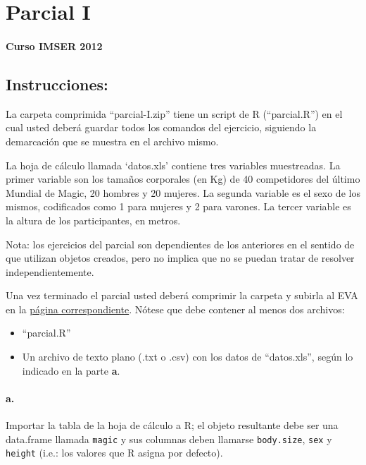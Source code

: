 \documentclass[]{article}
\begin{document}
\section{Parcial I}

\paragraph{Curso IMSER 2012}

\subsection{Instrucciones:}

La carpeta comprimida ``parcial-I.zip'' tiene un script de R
(``parcial.R'') en el cual usted deberá guardar todos los comandos del
ejercicio, siguiendo la demarcación que se muestra en el archivo mismo.

La hoja de cálculo llamada `datos.xls' contiene tres variables
muestreadas. La primer variable son los tamaños corporales (en Kg) de 40
competidores del último Mundial de Magic, 20 hombres y 20 mujeres. La
segunda variable es el sexo de los mismos, codificados como 1 para
mujeres y 2 para varones. La tercer variable es la altura de los
participantes, en metros.

Nota: los ejercicios del parcial son dependientes de los anteriores en
el sentido de que utilizan objetos creados, pero no implica que no se
puedan tratar de resolver independientemente.

Una vez terminado el parcial usted deberá comprimir la carpeta y subirla
al EVA en la
\href{http://eva.universidad.edu.uy/mod/assignment/view.php?id=99264}{página
correspondiente}. Nótese que debe contener al menos dos archivos:

\begin{itemize}
\item
  ``parcial.R''\\
\item
  Un archivo de texto plano (.txt o .csv) con los datos de
  ``datos.xls'', según lo indicado en la parte \textbf{a}.
\end{itemize}
\paragraph{a.}

Importar la tabla de la hoja de cálculo a R; el objeto resultante debe
ser una data.frame llamada \texttt{magic} y sus columnas deben llamarse
\texttt{body.size}, \texttt{sex} y \texttt{height} (i.e.: los valores
que R asigna por defecto).
\end{document}

